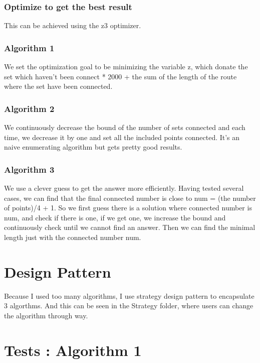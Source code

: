 \documentclass[12pt, a4paper]{article}
\begin{document}
				\subsubsection{Optimize to get the best result}

					This can be achieved using the z3 optimizer.

					\subsubsection{Algorithm 1}

					We set the optimization goal to be minimizing the variable z, which donate the set which haven't been connect * 2000 + the sum of the length of the route where the set have been connected.

					\subsubsection{Algorithm 2}

					We continuously decrease the bound of the number of sets connected and each time, we decrease it by one and set all the included points connected. It's an naive enumerating algorithm but gets pretty good results.

					\subsubsection{Algorithm 3}

					We use a clever guess to get the answer more efficiently. Having tested several cases, we can find that the final connected number is close to num = (the number of points)/4 + 1. So we first guess there is a solution where connected number is num, and check if there is one, if we get one, we increase the bound and continuously check until we cannot find an answer. Then we can find the minimal length just with the connected number num.

	\section{Design Pattern}

		Because I used too many algorithms, I use strategy design pattern to encapsulate 3 algorthms. And this can be seen in the Strategy folder, where users can change the algorithm through way.

	\section{Tests : Algorithm 1}
\end{document}
